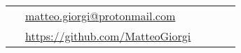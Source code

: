 \documentclass[10pt]{article} %
\begin{document}
\begin{paracol}{2}

\switchcolumn %


\parbox[top][0.12\textheight][c]{\linewidth}{ %
	\vspace{-0.04\textheight} %
	\colorbox{shade}{ %
		\begin{supertabular}{p{0.05\linewidth}|p{0.775\linewidth}} %
			\raisebox{0pt}{\small\faEnvelope} & \href{mailto:matteo.giorgi@protonmail.com}{matteo.giorgi@protonmail.com} \\ %
			\raisebox{-1pt}{\faGithub} & \href{https://github.com/MatteoGiorgi}{https://github.com/MatteoGiorgi} \\ %
		\end{supertabular}
	}
}



\end{paracol}
\end{document}
